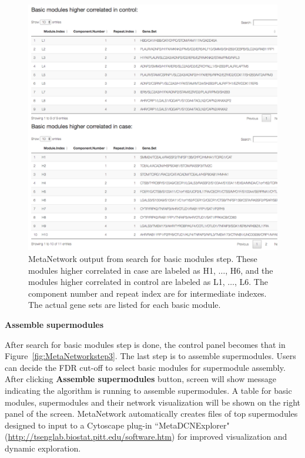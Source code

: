 \begin{steps}
\begin{figure}[H]
\begin{center}
\includegraphics[scale=0.9]{./figure/MetaNetwork/MetaNetworkBM}
\caption{MetaNetwork output from search for basic modules step.
These modules higher correlated in case are labeled as H1, $\ldots$, H6,
and the modules higher correlated in control are labeled as L1, $\ldots$, L6.
The component number and repeat index are for intermediate indexes.
The actual gene sets are listed for each basic module.
}
\label{fig:MetaNetworkBM}
\end{center}
\end{figure}

\item \textbf{Assemble supermodules}

After search for basic modules step is done, the control panel becomes that in Figure~\ref{fig:MetaNetworkstep3}. The last step is to assemble supermodules. Users can decide the FDR cut-off to select basic modules for supermodule assembly. 
After clicking \textbf{Assemble supermodules} button, screen will show message indicating the algorithm is running to assemble supermodules.
A table for basic modules, supermodules and their network visualization will be shown on the right panel of the screen.
MetaNetwork automatically creates files of top supermodules designed to input to a Cytoscape plug-in ``MetaDCNExplorer"
(\url{http://tsenglab.biostat.pitt.edu/software.htm}) for improved visualization and dynamic exploration.


\end{steps}
